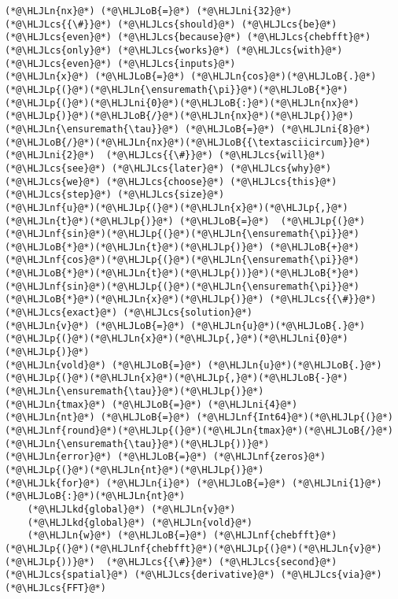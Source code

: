 \documentclass[12pt,a4paper]{article}
\newcommand{\HLJLk}[1]{\textcolor[RGB]{148,91,176}{\textbf{#1}}}
\newcommand{\HLJLkd}[1]{\textcolor[RGB]{214,102,97}{\textit{#1}}}
\newcommand{\HLJLn}[1]{#1}
\newcommand{\HLJLnf}[1]{\textcolor[RGB]{66,102,213}{#1}}
\newcommand{\HLJLni}[1]{\textcolor[RGB]{59,151,46}{#1}}
\newcommand{\HLJLoB}[1]{\textcolor[RGB]{102,102,102}{\textbf{#1}}}
\newcommand{\HLJLp}[1]{#1}
\newcommand{\HLJLcs}[1]{\textcolor[RGB]{153,153,119}{\textit{#1}}}
\begin{document}
\begin{lstlisting}
(*@\HLJLn{nx}@*) (*@\HLJLoB{=}@*) (*@\HLJLni{32}@*) (*@\HLJLcs{{\#}}@*) (*@\HLJLcs{should}@*) (*@\HLJLcs{be}@*) (*@\HLJLcs{even}@*) (*@\HLJLcs{because}@*) (*@\HLJLcs{chebfft}@*) (*@\HLJLcs{only}@*) (*@\HLJLcs{works}@*) (*@\HLJLcs{with}@*) (*@\HLJLcs{even}@*) (*@\HLJLcs{inputs}@*)
(*@\HLJLn{x}@*) (*@\HLJLoB{=}@*) (*@\HLJLn{cos}@*)(*@\HLJLoB{.}@*)(*@\HLJLp{(}@*)(*@\HLJLn{\ensuremath{\pi}}@*)(*@\HLJLoB{*}@*)(*@\HLJLp{(}@*)(*@\HLJLni{0}@*)(*@\HLJLoB{:}@*)(*@\HLJLn{nx}@*)(*@\HLJLp{)}@*)(*@\HLJLoB{/}@*)(*@\HLJLn{nx}@*)(*@\HLJLp{)}@*)
(*@\HLJLn{\ensuremath{\tau}}@*) (*@\HLJLoB{=}@*) (*@\HLJLni{8}@*)(*@\HLJLoB{/}@*)(*@\HLJLn{nx}@*)(*@\HLJLoB{{\textasciicircum}}@*)(*@\HLJLni{2}@*)  (*@\HLJLcs{{\#}}@*) (*@\HLJLcs{will}@*) (*@\HLJLcs{see}@*) (*@\HLJLcs{later}@*) (*@\HLJLcs{why}@*) (*@\HLJLcs{we}@*) (*@\HLJLcs{choose}@*) (*@\HLJLcs{this}@*) (*@\HLJLcs{step}@*) (*@\HLJLcs{size}@*)
(*@\HLJLnf{u}@*)(*@\HLJLp{(}@*)(*@\HLJLn{x}@*)(*@\HLJLp{,}@*)(*@\HLJLn{t}@*)(*@\HLJLp{)}@*) (*@\HLJLoB{=}@*)  (*@\HLJLp{(}@*)(*@\HLJLnf{sin}@*)(*@\HLJLp{(}@*)(*@\HLJLn{\ensuremath{\pi}}@*)(*@\HLJLoB{*}@*)(*@\HLJLn{t}@*)(*@\HLJLp{)}@*) (*@\HLJLoB{+}@*) (*@\HLJLnf{cos}@*)(*@\HLJLp{(}@*)(*@\HLJLn{\ensuremath{\pi}}@*)(*@\HLJLoB{*}@*)(*@\HLJLn{t}@*)(*@\HLJLp{))}@*)(*@\HLJLoB{*}@*)(*@\HLJLnf{sin}@*)(*@\HLJLp{(}@*)(*@\HLJLn{\ensuremath{\pi}}@*)(*@\HLJLoB{*}@*)(*@\HLJLn{x}@*)(*@\HLJLp{)}@*) (*@\HLJLcs{{\#}}@*) (*@\HLJLcs{exact}@*) (*@\HLJLcs{solution}@*)
(*@\HLJLn{v}@*) (*@\HLJLoB{=}@*) (*@\HLJLn{u}@*)(*@\HLJLoB{.}@*)(*@\HLJLp{(}@*)(*@\HLJLn{x}@*)(*@\HLJLp{,}@*)(*@\HLJLni{0}@*)(*@\HLJLp{)}@*) 
(*@\HLJLn{vold}@*) (*@\HLJLoB{=}@*) (*@\HLJLn{u}@*)(*@\HLJLoB{.}@*)(*@\HLJLp{(}@*)(*@\HLJLn{x}@*)(*@\HLJLp{,}@*)(*@\HLJLoB{-}@*)(*@\HLJLn{\ensuremath{\tau}}@*)(*@\HLJLp{)}@*)
(*@\HLJLn{tmax}@*) (*@\HLJLoB{=}@*) (*@\HLJLni{4}@*) 
(*@\HLJLn{nt}@*) (*@\HLJLoB{=}@*) (*@\HLJLnf{Int64}@*)(*@\HLJLp{(}@*)(*@\HLJLnf{round}@*)(*@\HLJLp{(}@*)(*@\HLJLn{tmax}@*)(*@\HLJLoB{/}@*)(*@\HLJLn{\ensuremath{\tau}}@*)(*@\HLJLp{))}@*)
(*@\HLJLn{error}@*) (*@\HLJLoB{=}@*) (*@\HLJLnf{zeros}@*)(*@\HLJLp{(}@*)(*@\HLJLn{nt}@*)(*@\HLJLp{)}@*)
(*@\HLJLk{for}@*) (*@\HLJLn{i}@*) (*@\HLJLoB{=}@*) (*@\HLJLni{1}@*)(*@\HLJLoB{:}@*)(*@\HLJLn{nt}@*)
    (*@\HLJLkd{global}@*) (*@\HLJLn{v}@*)
    (*@\HLJLkd{global}@*) (*@\HLJLn{vold}@*)
    (*@\HLJLn{w}@*) (*@\HLJLoB{=}@*) (*@\HLJLnf{chebfft}@*)(*@\HLJLp{(}@*)(*@\HLJLnf{chebfft}@*)(*@\HLJLp{(}@*)(*@\HLJLn{v}@*)(*@\HLJLp{))}@*)  (*@\HLJLcs{{\#}}@*) (*@\HLJLcs{second}@*) (*@\HLJLcs{spatial}@*) (*@\HLJLcs{derivative}@*) (*@\HLJLcs{via}@*) (*@\HLJLcs{FFT}@*)

\end{lstlisting}
\end{document}
